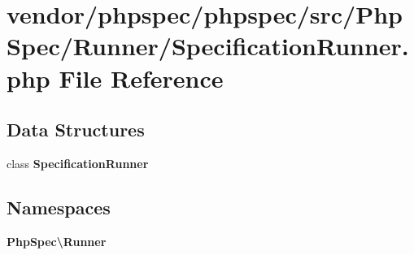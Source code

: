 \section{vendor/phpspec/phpspec/src/\+Php\+Spec/\+Runner/\+Specification\+Runner.php File Reference}
\label{_specification_runner_8php}
\subsection*{Data Structures}
\begin{DoxyCompactItemize}
\item 
class {\bf Specification\+Runner}
\end{DoxyCompactItemize}
\subsection*{Namespaces}
\begin{DoxyCompactItemize}
\item 
 {\bf Php\+Spec\textbackslash{}\+Runner}
\end{DoxyCompactItemize}

